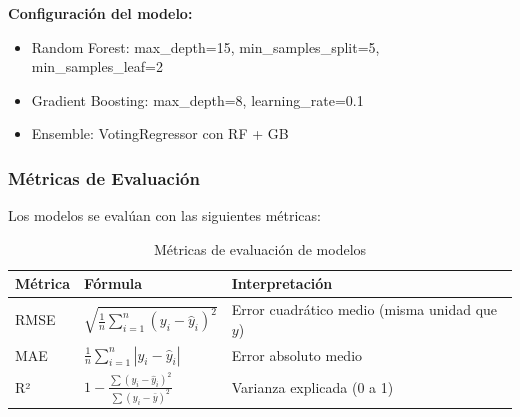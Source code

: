 \documentclass[12pt,a4paper]{scrartcl}
\begin{document}
\textbf{Configuración del modelo:}
\begin{itemize}
    \item Random Forest: max\_depth=15, min\_samples\_split=5, min\_samples\_leaf=2
    \item Gradient Boosting: max\_depth=8, learning\_rate=0.1
    \item Ensemble: VotingRegressor con RF + GB
\end{itemize}

\subsubsection{Métricas de Evaluación}

Los modelos se evalúan con las siguientes métricas:

\begin{table}[h]
\centering
\begin{tabular}{@{}lll@{}}
\toprule
\textbf{Métrica} & \textbf{Fórmula} & \textbf{Interpretación} \\
\midrule
RMSE & $\sqrt{\frac{1}{n}\sum_{i=1}^{n}(y_i - \hat{y}_i)^2}$ & Error cuadrático medio (misma unidad que $y$) \\
MAE & $\frac{1}{n}\sum_{i=1}^{n}|y_i - \hat{y}_i|$ & Error absoluto medio \\
R² & $1 - \frac{\sum(y_i - \hat{y}_i)^2}{\sum(y_i - \bar{y})^2}$ & Varianza explicada (0 a 1) \\
\bottomrule
\end{tabular}
\caption{Métricas de evaluación de modelos}
\end{table}



\end{document}
